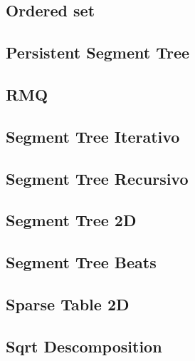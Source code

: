 \subsection{Ordered set}
\raggedbottom
\hrulefill
\subsection{Persistent Segment Tree}
\raggedbottom
\hrulefill
\subsection{RMQ}
\raggedbottom
\hrulefill
\subsection{Segment Tree Iterativo}
\raggedbottom
\hrulefill
\subsection{Segment Tree Recursivo}
\raggedbottom
\hrulefill
\subsection{Segment Tree 2D}
\raggedbottom
\hrulefill
\subsection{Segment Tree Beats}
\raggedbottom
\hrulefill
\subsection{Sparse Table 2D}
\raggedbottom
\hrulefill
\subsection{Sqrt Descomposition}
\raggedbottom
\hrulefill
